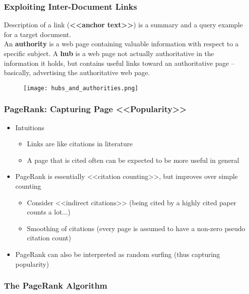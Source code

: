 \subsubsection{Exploiting Inter-Document Links}

Description of a link (\textbf{<<anchor text>>}) is a summary and a query example for a target document.\\

An \textbf{authority} is a web page containing valuable information with respect to a specific subject. A \textbf{hub} is a web page not actually authoritative in the information it holds, but contains useful links toward an authoritative page – basically, advertising the authoritative web page.

\begin{figure}[H]
    \centering
    \texttt{[image: hubs\_and\_authorities.png]}
\end{figure}


\subsubsection{PageRank: Capturing Page <<Popularity>>}
\begin{itemize}
\item Intuitions
\begin{itemize}
\item Links are like citations in literature
\item A page that is cited often can be expected to be more useful in general
\end{itemize}

\item PageRank is essentially <<citation counting>>, but improves over simple counting
\begin{itemize}
\item Consider <<indirect citations>> (being cited by a highly cited paper counts a lot...)
\item Smoothing of citations (every page is assumed to have a non-zero pseudo citation count)
\end{itemize}

\item PageRank can also be interpreted as random surfing (thus capturing popularity)
\end{itemize}


\subsubsection{The PageRank Algorithm}


